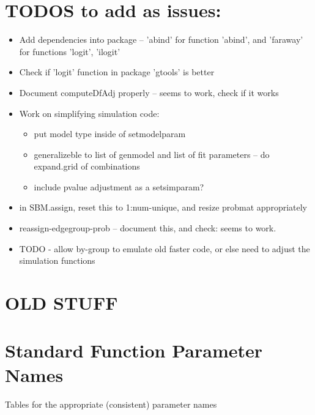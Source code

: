 \documentclass[11pt]{article}
\begin{document}
\section{TODOS to add as issues:}
\begin{itemize}
\item Add dependencies into package -- 'abind' for function 'abind', and 'faraway' for functions 'logit', 'ilogit'
\item Check if 'logit' function in package 'gtools' is better
\item Document computeDfAdj properly -- seems to work, check if it works
\item Work on simplifying simulation code: 
\begin{itemize}
\item put model type inside of setmodelparam
\item generalizeble to list of genmodel and list of fit parameters -- do expand.grid of combinations
\item include pvalue adjustment as a setsimparam?
\end{itemize}
\item in SBM.assign, reset this to 1:num-unique, and resize probmat appropriately
\item reassign-edgegroup-prob -- document this, and check: seems to work. 
\item TODO - allow by-group to emulate old faster code, or else need to adjust the simulation functions
\end{itemize}









\pagebreak

\section{OLD STUFF} 
\section{Standard Function Parameter Names}
Tables for the appropriate (consistent) parameter names
\end{document}
